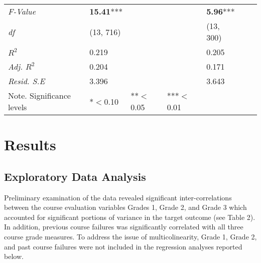 \documentclass[sigconf]{acmart}
\begin{document}
\begin{table*}[ht]
\begin{tabular}{lllllll}
    \textit{F-Value}    & \textbf{15.41}***  &       &        & \textbf{5.96}***    &       &       \\
    \textit{df}         &   (13, 716)        &       &        &      (13, 300)      &       &       \\
    \textit{$R^2$}      &      0.219         &       &        &         0.205       &       &       \\ 
    \textit{Adj. $R^2$} &      0.204         &       &        &         0.171       &       &       \\
    \textit{Resid. S.E} &      3.396         &       &        &         3.643       &       &       \\
    \bottomrule
    Note. Significance levels & *$<$0.10      & **$<$0.05  & ***$<$0.01 & & &
  \end{tabular}
\end{table*}


\section{Results}

\subsection{Exploratory Data Analysis}

Preliminary examination of the data revealed significant inter-correlations 
between the course evaluation variables Grades 1, Grade 2, and Grade 3 
which accounted for significant portions of variance in the target outcome 
(see Table 2). In addition, previous course failures was significantly 
correlated with all three course grade measures. To address the issue of 
multicolinearity, Grade 1, Grade 2, and past course failures were not included 
in the regression analyses reported below.

\end{document}
